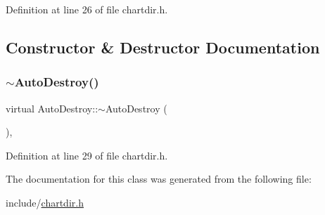 Definition at line 26 of file chartdir.\+h.



\subsection{Constructor \& Destructor Documentation}
\mbox{\label{class_auto_destroy_a58da3c9b1bfebfe2c2085a4792fabd27}} 
\subsubsection{\texorpdfstring{$\sim$\+Auto\+Destroy()}{~AutoDestroy()}}
{\footnotesize\ttfamily virtual Auto\+Destroy\+::$\sim$\+Auto\+Destroy (\begin{DoxyParamCaption}{ }\end{DoxyParamCaption})\hspace{0.3cm}{\ttfamily [inline]}, {\ttfamily [virtual]}}



Definition at line 29 of file chartdir.\+h.



The documentation for this class was generated from the following file\+:\begin{DoxyCompactItemize}
\item 
include/\hyperlink{chartdir_8h}{chartdir.\+h}\end{DoxyCompactItemize}
